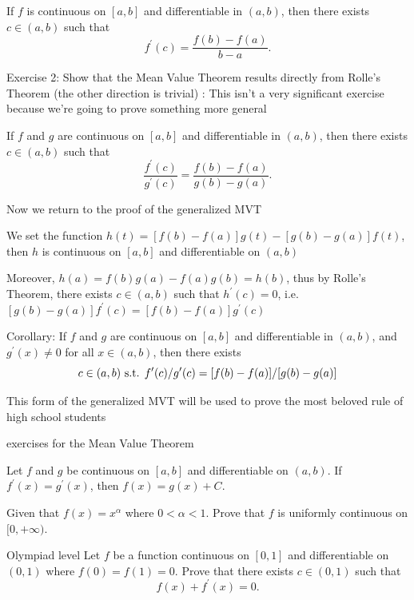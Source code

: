 \begin{theorem}
If $f$ is continuous on $[a,b]$ and differentiable in $(a,b)$, then there exists $c\in(a,b)$ such that
\[ f^\prime(c)=\frac{f(b)-f(a)}{b-a}. \]
\end{theorem}

Exercise 2: Show that the Mean Value Theorem results directly from Rolle's Theorem (the other direction is trivial)
:
This isn't a very significant exercise because we're going to prove something more general

\begin{theorem}
If $f$ and $g$ are continuous on $[a,b]$ and differentiable in $(a,b)$, then there exists $c\in(a,b)$ such that
\[ \frac{f^\prime(c)}{g^\prime(c)}=\frac{f(b)-f(a)}{g(b)-g(a)}. \]
\end{theorem}


Now we return to the proof of the generalized MVT

We set the function $h(t)=[f(b)-f(a)]g(t)-[g(b)-g(a)]f(t)$, then $h$ is continuous on $[a,b]$ and differentiable on $(a,b)$

Moreover, $h(a)=f(b)g(a)-f(a)g(b)=h(b)$, thus by Rolle's Theorem, there exists $c\in(a,b)$ such that $h^\prime(c)=0$, i.e. $[g(b)-g(a)]f^\prime(c)=[f(b)-f(a)]g^\prime(c)$

Corollary: If $f$ and $g$ are continuous on $[a,b]$ and differentiable in $(a,b)$, and $g^\prime(x)\neq0$ for all $x\in(a,b)$, then there exists \[ c\in(a,b) \text{ s.t. } f^\prime(c)/g^\prime(c)=[f(b)-f(a)]/[g(b)-g(a)] \]

This form of the generalized MVT will be used to prove the most beloved rule of high school students

exercises for the Mean Value Theorem

\begin{exercise}{}{}
Let $f$ and $g$ be continuous on $[a,b]$ and differentiable on $(a,b)$. If $f^\prime(x)=g^\prime(x)$, then $f(x)=g(x)+C$.
\end{exercise}

\begin{exercise}{}{}
Given that $f(x)=x^\alpha$ where $0<\alpha<1$. Prove that $f$ is uniformly continuous on $[0,+\infty)$.
\end{exercise}

\begin{exercise}{Olympiad level}{}
Let $f$ be a function continuous on $[0,1]$ and differentiable on $(0,1)$ where $f(0)=f(1)=0$. Prove that there exists $c\in(0,1)$ such that
\[ f(x)+f^\prime(x)=0. \]
\end{exercise}

